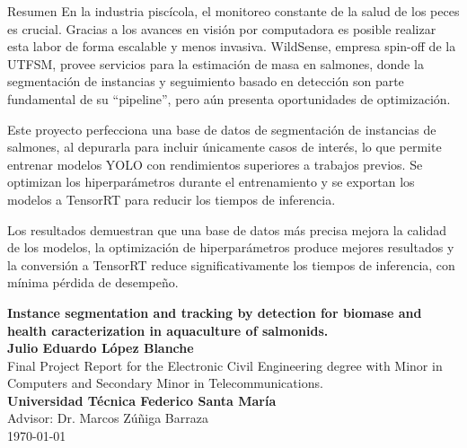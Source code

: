 \begin{poliabstract}{Resumen} 
\normalsize
En la industria piscícola, el monitoreo constante de la salud de los peces es crucial. Gracias a los avances en visión por computadora es posible realizar esta labor de forma escalable y menos invasiva. WildSense, empresa spin-off de la UTFSM, provee servicios para la estimación de masa en salmones, donde la segmentación de instancias y seguimiento basado en detección son parte fundamental de su ``pipeline'', pero aún presenta oportunidades de optimización.

Este proyecto perfecciona una base de datos de segmentación de instancias de salmones, al depurarla para incluir únicamente casos de interés, lo que permite entrenar modelos YOLO con rendimientos superiores a trabajos previos. Se optimizan los hiperparámetros durante el entrenamiento y se exportan los modelos a TensorRT para reducir los tiempos de inferencia.

Los resultados demuestran que una base de datos más precisa mejora la calidad de los modelos, la optimización de hiperparámetros produce mejores resultados y la conversión a TensorRT reduce significativamente los tiempos de inferencia, con mínima pérdida de desempeño.
\end{poliabstract}

\normalsize
{}

\newpage

\begin{center}
    {\singlespacing\Large{\textbf{Instance segmentation and tracking by detection for biomase and health caracterization in aquaculture of salmonids.}}}\\

    \normalsize
    \textbf{Julio Eduardo López Blanche}\\

    Final Project Report for the Electronic Civil Engineering degree with Minor in Computers and Secondary Minor in Telecommunications.\\

    \textbf{Universidad Técnica Federico Santa María}\\

    Advisor: Dr. Marcos Zúñiga Barraza\\

    \monthyeardate\today
\end{center}

